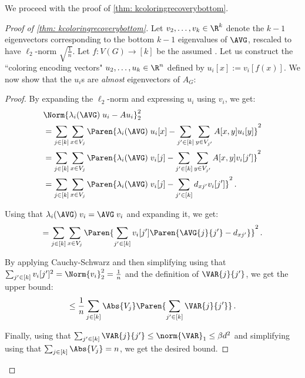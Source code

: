 We proceed with the proof of \cref{thm: kcoloringrecoverybottom}.

\begin{proof}[Proof of \cref{thm: kcoloringrecoverybottom}]
    Let $v_2, \ldots, v_k \in \R^k$ denote the $k-1$ eigenvectors corresponding to the bottom $k-1$ eigenvalues of $\AVG$, rescaled to have $\ell_2$-norm $\sqrt{\frac{1}{n}}$.
    Let $f:V(G)\to[k]$ be the assumed \kcl.
    Let us construct the ``coloring encoding vectors" $u_2, \ldots, u_k \in \R^n$ defined by $u_i[x]:=v_i[f(x)]$.
    We now show that the $u_i$s are \textit{almost} eigenvectors of $A_G$:

    \begin{proof}
    By expanding the $\ell_2$-norm and expressing $u_i$ using $v_i$, we get:
        \begin{align*}
            &\Norm{\lambda_i(\AVG)\;u_i-A u_i}_2^2\\
            &=\sum_{j\in[k]}\sum_{x\in V_j} \Paren{\lambda_i(\AVG)\;u_i[x] -\sum_{j'\in[k]}\sum_{y\in V_{j'}}A[x, y]u_i[y]}^2\\
            &=\sum_{j\in[k]}\sum_{x\in V_j} \Paren{\lambda_i(\AVG)\;v_i[j] -\sum_{j'\in[k]}\sum_{y\in V_{j'}}A[x, y]v_i[j']}^2\\
            &=\sum_{j\in[k]}\sum_{x\in V_j} \Paren{\lambda_i(\AVG)\;v_i[j] -\sum_{j'\in[k]}d_{xj'} v_i[j']}^2\,.
        \end{align*}

        Using that $\lambda_i(\AVG)\;v_i = \AVG\;v_i$ and expanding it, we get: 
        $$=\sum_{j\in[k]}\sum_{x\in V_j} \Paren{\sum_{j'\in[k]} v_i[j']\Paren{\AVG{j}{j'} - d_{xj'}}}^2\,.$$

        By applying Cauchy-Schwarz and then simplifying using that $\sum_{j'\in[k]} v_i[j']^2=\Norm{v_i}_2^2=\frac{1}{n}$ and the definition of $\VAR{j}{j'}$, we get the upper bound:
        $$\leq\frac{1}{n}\sum_{j\in[k]}\Abs{V_j}\Paren{\sum_{j'\in[k]} \VAR{j}{j'}}\,.$$

        Finally, using that $\sum_{j'\in[k]} \VAR{j}{j'}\leq \norm{\VAR}_1\leq\beta d^2$ and simplifying using that $\sum_{j\in[k]}\Abs{V_j}=n$, we get the desired bound.
    \end{proof}


\end{proof}
